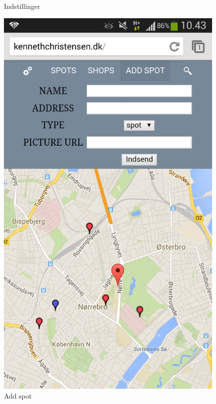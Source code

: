 \documentclass[12pt]{article}
\begin{document}
\begin{figure}[ht]
\begin{minipage}[b]{0.45\linewidth}
\caption{Indstillinger}
\label{fig:figure3}
\end{minipage}
\hspace{0.5cm}
\begin{minipage}[b]{0.45\linewidth}
\centering
\includegraphics[width=\textwidth]{addspotscreen}
\caption{Add spot}
\label{fig:figure4}
\end{minipage}
\end{figure}
\end{document}
